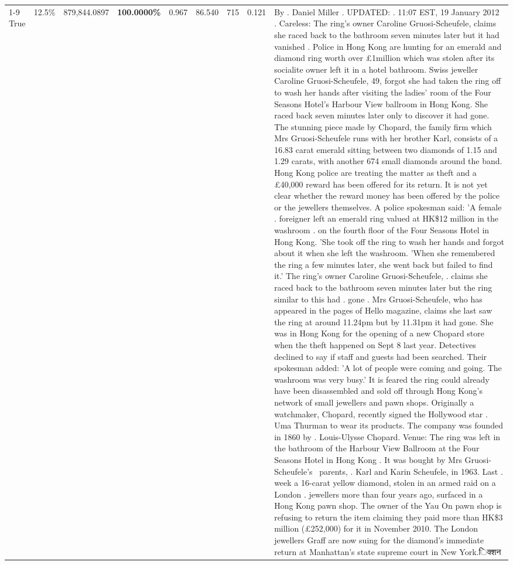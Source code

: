 \begin{table}[H]
\begin{tabular}{lllrlllll}
\cline{1-9} \cline{2-9}
True & 12.5\% & 879,844.0897 & \bfseries \color{red} 100.0000\% & 0.967 & 86.540 & 715 & 0.121 & By . Daniel Miller . UPDATED: . 11:07 EST, 19 January 2012 . Careless: The ring's owner Caroline Gruosi-Scheufele, claims she raced back to the bathroom seven minutes later but it had vanished . Police in Hong Kong are hunting for an emerald and diamond ring worth over £1million which was stolen after its socialite owner left it in a hotel bathroom. Swiss jeweller Caroline Gruosi-Scheufele, 49, forgot she had taken the ring off to wash her hands after visiting the ladies' room of the Four Seasons Hotel's Harbour View ballroom in Hong Kong. She raced back seven minutes later only to discover it had gone. The stunning piece made by Chopard, the family firm which Mrs Gruosi-Scheufele runs with her brother Karl, consists of a 16.83 carat emerald sitting between two diamonds of 1.15 and 1.29 carats, with another 674 small diamonds around the band. Hong Kong police are treating the matter as theft and a £40,000 reward has been offered for its return. It is not yet clear whether the reward money has been offered by the police or the jewellers themselves. A police spokesman said: 'A female . foreigner left an emerald ring valued at HK\$12 million in the washroom . on the fourth floor of the Four Seasons Hotel in Hong Kong. 'She took off the ring to wash her hands and forgot about it when she left the washroom. 'When she remembered the ring a few minutes later, she went back but failed to find it.' The ring's owner Caroline Gruosi-Scheufele, . claims she raced back to the bathroom seven minutes later but the ring similar to this had . gone . Mrs Gruosi-Scheufele, who has appeared in the pages of Hello magazine, claims she last saw the ring at around 11.24pm but by 11.31pm it had gone. She was in Hong Kong for the opening of a new Chopard store when the theft happened on Sept 8 last year. Detectives declined to say if staff and guests had been searched. Their spokesman added: 'A lot of people were coming and going. The washroom was very busy.' It is feared the ring could already have been disassembled and sold off through Hong Kong's network of small jewellers and pawn shops. Originally a watchmaker, Chopard, recently signed the Hollywood star . Uma Thurman to wear its products. The company was founded in 1860 by . Louis-Ulysse Chopard. Venue: The ring was left in the bathroom of the Harbour View Ballroom at the Four Seasons Hotel in Hong Kong . It was bought by Mrs Gruosi-Scheufele's  parents, . Karl and Karin Scheufele, in 1963. Last . week a 16-carat yellow diamond, stolen in an armed raid on a London . jewellers more than four years ago, surfaced in a Hong Kong pawn shop. The owner of the Yau On pawn shop is refusing to return the item claiming they paid more than HK\$3 million (£252,000) for it in November 2010. The London jewellers Graff are now suing for the diamond’s immediate return at Manhattan’s state supreme court in New York.िक्शन \\

\end{tabular}
\end{table}
